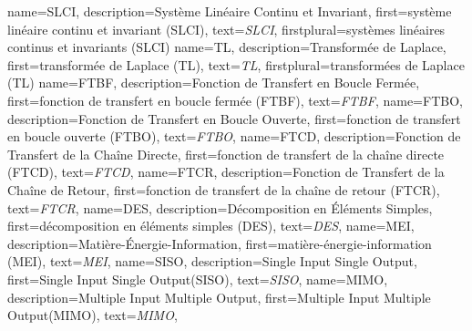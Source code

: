 {%
  name={SLCI},%
  description={Système Linéaire Continu et Invariant},%
  first={système\- lin\-éaire\- con\-tinu\- et\- in\-va\-riant\- (SLCI)},%
  text={\emph{{\scshape SLCI}}},%
  firstplural={systèmes\- linéaires\- continus\- et\- invariants\- (SLCI)}%
}
{%
  name={TL},%
  description={Transformée de Laplace},%
  first={transformée de Laplace (TL)},%
  text={\emph{{\scshape TL}}},%
  firstplural={transformées de Laplace (TL)}%
}
{%
  name={FTBF},%
  description={Fonction de Transfert en Boucle Fermée},%
  first={fonction de transfert en boucle fermée (FTBF)},%
  text={\emph{{\scshape FTBF}}},%
}
{%
  name={FTBO},%
  description={Fonction de Transfert en Boucle Ouverte},%
  first={fonction de transfert en boucle ouverte (FTBO)},%
  text={\emph{{\scshape FTBO}}},%
}
{%
  name={FTCD},%
  description={Fonction de Transfert de la Chaîne Directe},%
  first={fonction de transfert de la chaîne directe (FTCD)},%
  text={\emph{{\scshape FTCD}}},%
}
{%
  name={FTCR},%
  description={Fonction de Transfert de la Chaîne de Retour},%
  first={fonction de transfert de la chaîne de retour (FTCR)},%
  text={\emph{{\scshape FTCR}}},%
}
{%
  name={DES},%
  description={Décomposition en \'Eléments Simples},%
  first={dé\-compo\-sition\- en\- éléments\- simples\- (DES)},%
  text={\emph{{\scshape DES}}},%
}
{%
  name={MEI},%
  description={Matière-\'Energie-Information},%
  first={matière-énergie-information (MEI)},%
  text={\emph{{\scshape MEI}}},%
}
{%
  name={SISO},%
  description={Single Input Single Output},%
  first={\og Single Input Single Output\fg (SISO)},%
  text={\emph{{\scshape SISO}}},%
}
{%
  name={MIMO},%
  description={Multiple Input Multiple Output},%
  first={\og Multiple Input Multiple Output\fg (MIMO)},%
  text={\emph{{\scshape MIMO}}},%
}
